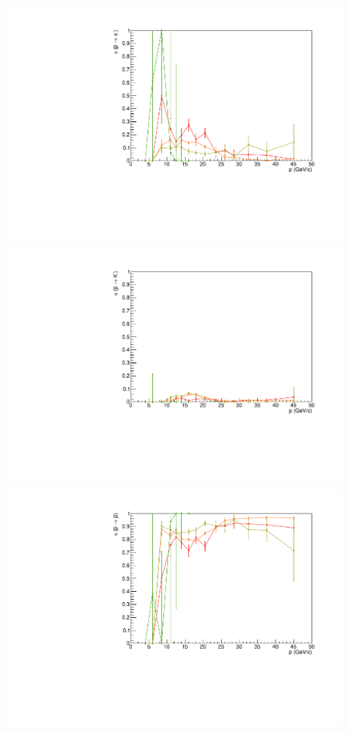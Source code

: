 \begin{figure}[!p]
  \centering
	\includegraphics[scale=0.38]{./gfx/pm_pi.pdf}
  \includegraphics[scale=0.38]{./gfx/pm_K.pdf}
  \includegraphics[scale=0.38]{./gfx/pm_p.pdf}

\end{figure}
